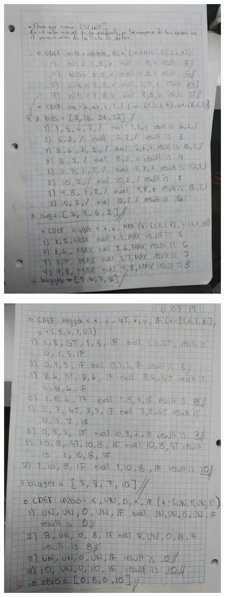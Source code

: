 \begin{figure}[H]
	\centering
	\includegraphics[scale=1]{imagenes/practica/p2-2.jpg}
\end{figure}
\begin{figure}[H]
	\centering
	\includegraphics[scale=1]{imagenes/practica/p2-3.jpg}
\end{figure}
